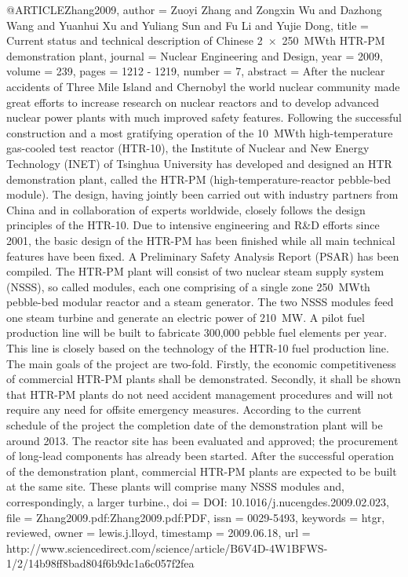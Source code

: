 {{@ARTICLE{Zhang2009,
  author = {Zuoyi Zhang and Zongxin Wu and Dazhong Wang and Yuanhui Xu and Yuliang
	Sun and Fu Li and Yujie Dong},
  title = {Current status and technical description of Chinese 2 × 250 MWth
	HTR-PM demonstration plant},
  journal = {Nuclear Engineering and Design},
  year = {2009},
  volume = {239},
  pages = {1212 - 1219},
  number = {7},
  abstract = {After the nuclear accidents of Three Mile Island and Chernobyl the
	world nuclear community made great efforts to increase research on
	nuclear reactors and to develop advanced nuclear power plants with
	much improved safety features. Following the successful construction
	and a most gratifying operation of the 10 MWth high-temperature gas-cooled
	test reactor (HTR-10), the Institute of Nuclear and New Energy Technology
	(INET) of Tsinghua University has developed and designed an HTR demonstration
	plant, called the HTR-PM (high-temperature-reactor pebble-bed module).
	The design, having jointly been carried out with industry partners
	from China and in collaboration of experts worldwide, closely follows
	the design principles of the HTR-10. Due to intensive engineering
	and R&D efforts since 2001, the basic design of the HTR-PM has been
	finished while all main technical features have been fixed. A Preliminary
	Safety Analysis Report (PSAR) has been compiled. The HTR-PM plant
	will consist of two nuclear steam supply system (NSSS), so called
	modules, each one comprising of a single zone 250 MWth pebble-bed
	modular reactor and a steam generator. The two NSSS modules feed
	one steam turbine and generate an electric power of 210 MW. A pilot
	fuel production line will be built to fabricate 300,000 pebble fuel
	elements per year. This line is closely based on the technology of
	the HTR-10 fuel production line. The main goals of the project are
	two-fold. Firstly, the economic competitiveness of commercial HTR-PM
	plants shall be demonstrated. Secondly, it shall be shown that HTR-PM
	plants do not need accident management procedures and will not require
	any need for offsite emergency measures. According to the current
	schedule of the project the completion date of the demonstration
	plant will be around 2013. The reactor site has been evaluated and
	approved; the procurement of long-lead components has already been
	started. After the successful operation of the demonstration plant,
	commercial HTR-PM plants are expected to be built at the same site.
	These plants will comprise many NSSS modules and, correspondingly,
	a larger turbine.},
  doi = {DOI: 10.1016/j.nucengdes.2009.02.023},
  file = {Zhang2009.pdf:Zhang2009.pdf:PDF},
  issn = {0029-5493},
  keywords = {htgr, reviewed},
  owner = {lewis.j.lloyd},
  timestamp = {2009.06.18},
  url = {http://www.sciencedirect.com/science/article/B6V4D-4W1BFWS-1/2/14b98ff8bad804f6b9dc1a6c057f2fea}
}

}}
